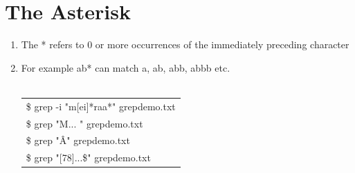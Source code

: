 \documentclass[12pt, a4paper]{report}
\begin{document}
\section{The Asterisk}
\begin{enumerate}
\item The * refers to 0 or more occurrences of the immediately preceding character
\item For example ab* can match a, ab, abb, abbb etc.\\
\\
\begin{tabular}{|l|} \hline
\$ grep -i "m[ei]*raa*" grepdemo.txt\\
\$ grep "M... " grepdemo.txt\\
\$ grep "\^A" grepdemo.txt\\
\$ grep "[78]...\$" grepdemo.txt\\ \hline
\end{tabular}
\end{enumerate}
\end{document}
